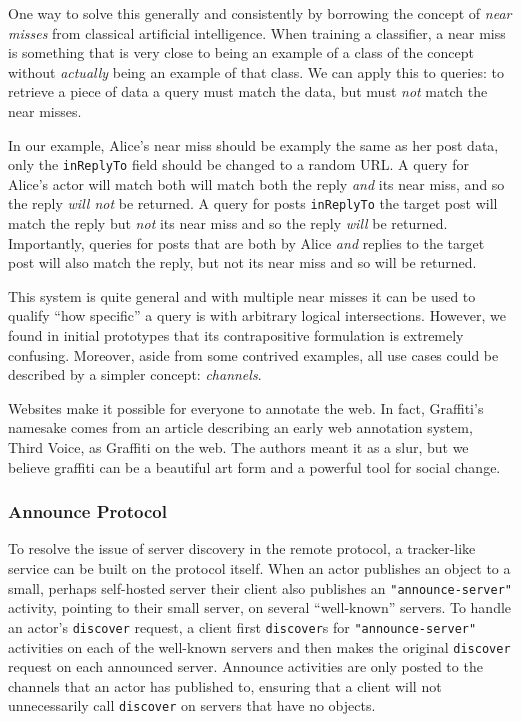 One way to solve this generally and consistently by borrowing the concept of \emph{near misses} from classical artificial intelligence.
When training a classifier, a near miss is something that is very close to being an example of a class of the concept without \emph{actually} being an example of that class.
We can apply this to queries: to retrieve a piece of data a query must match the data, but must \emph{not} match the near misses.

In our example, Alice's near miss should be examply the same as her post data, only
the \texttt{inReplyTo} field should be changed to a random URL.
A query for Alice's actor will match both will match both the reply \emph{and} its near miss, and so the reply \emph{will not} be returned.
A query for posts \texttt{inReplyTo} the target post will match the reply but \emph{not} its near miss and so the reply \emph{will} be returned.
Importantly, queries for posts that are both by Alice \emph{and} replies to the target post will also match the reply, but not its near miss and so will be returned.

This system is quite general and with multiple near misses it can be used to qualify ``how specific'' a query is with arbitrary logical intersections.
However, we found in initial prototypes that its contrapositive formulation is extremely confusing.
Moreover, aside from some contrived examples, all use cases could be described by a simpler concept: \emph{channels}.


Websites make it possible for everyone to annotate the web.
In fact, Graffiti's namesake comes from an article
describing an early web annotation system, Third Voice,
as Graffiti on the web.
The authors meant it as a slur, but we believe graffiti
can be a beautiful art form and a powerful tool for social change.

\subsubsection{Announce Protocol}
\label{above-and-below:announce-protocol}

To resolve the issue of server discovery in the remote protocol,
a tracker-like service can be built on the protocol itself.
When an actor publishes an object to a small, perhaps self-hosted
server their client also publishes an \texttt{"announce-server"}
activity, pointing to their small server, on several ``well-known'' servers.
To handle an actor's \texttt{discover} request, a client first \texttt{discover}s
for \texttt{"announce-server"} activities on each of the well-known
servers and then makes the original \texttt{discover} request on each
announced server.
Announce activities are only posted to the channels
that an actor has published to, ensuring that a client
will not unnecessarily call \texttt{discover} on servers
that have no objects.

